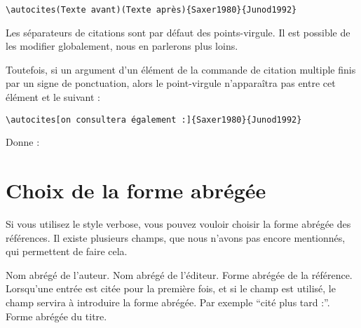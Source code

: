 \begin{verbatim}
\autocites(Texte avant)(Texte après){Saxer1980}{Junod1992}
\end{verbatim}

Les séparateurs de citations sont par défaut des points-virgule. Il est possible de les modifier globalement, nous en parlerons plus loins.

Toutefois, si un argument  d'un élément de la commande de citation multiple finis par un signe de ponctuation, alors le point-virgule n'apparaîtra pas entre cet élément et le suivant :

\begin{verbatim}
\autocites[on consultera également :]{Saxer1980}{Junod1992}
\end{verbatim}

Donne :

\begin{quotation}
\cites[on consultera également :]{Saxer1980}{Junod1992}
\end{quotation}

\cite[24]{Junod1992}


\section{Choix de la forme abrégée}

Si vous utilisez le style verbose, vous pouvez vouloir choisir la forme abrégée des références. Il existe plusieurs champs, que nous n'avons pas encore mentionnés, qui permettent de faire cela.

\begin{fieldlist}
	 Nom abrégé de l'auteur.
	 Nom abrégé de l'éditeur.
	 Forme abrégée de la référence.
	 Lorsqu'une entrée est citée pour la première fois, et si le champ  est utilisé, le champ  servira à introduire la forme abrégée. Par exemple \enquote{cité plus tard :}.
	 Forme abrégée du titre.
\end{fieldlist}

